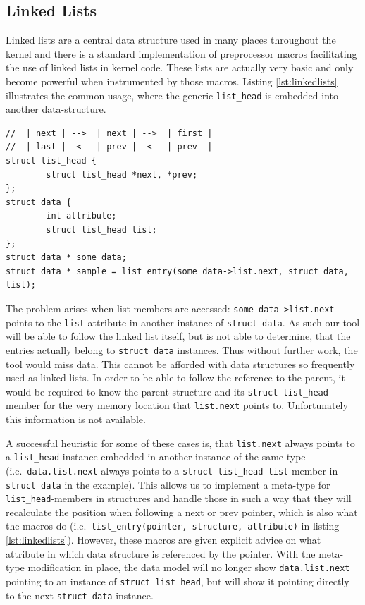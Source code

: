 \subsection{Linked Lists}
\label{sec:linkedlists}
Linked lists are a central data structure used in many places throughout the kernel and there is a standard implementation of preprocessor macros facilitating the use of linked lists in kernel code.
These lists are actually very basic and only become powerful when instrumented by those macros.
Listing \ref{lst:linkedlists} illustrates the common usage, where the generic \texttt{list\_head} is embedded into another data-structure.
\begin{lstlisting}[frame=single,caption=Linked lists as used in the linux kernel,label=lst:linkedlists]
//  | next | -->  | next | -->  | first | 
//  | last |  <-- | prev |  <-- | prev  |
struct list_head {
        struct list_head *next, *prev;
};
struct data {
        int attribute;
        struct list_head list;
};
struct data * some_data;
struct data * sample = list_entry(some_data->list.next, struct data, list);
\end{lstlisting}
The problem arises when list-members are accessed: \texttt{some\_data->list.next} points to the \texttt{list} attribute in another instance of \texttt{struct data}.
As such our tool will be able to follow the linked list itself, but is not able to determine, that the entries actually belong to \texttt{struct data} instances.
Thus without further work, the tool would miss data. This cannot be afforded with data structures so frequently used as linked lists.
In order to be able to follow the reference to the parent, it would be required to know the parent structure and its \texttt{struct list\_head} member for the very memory location that \texttt{list.next} points to.
Unfortunately this information is not available.

A successful heuristic for some of these cases is, that \texttt{list.next} always points to a \texttt{list\_head}-instance embedded in another instance of the same type
(i.e.~\texttt{data.list.next} always points to a \texttt{struct list\_head list} member in \texttt{struct data} in the example).
This allows us to implement a meta-type for \texttt{list\_head}-members in structures and handle those in such a way that they will recalculate the position when following a next or prev pointer,
which is also what the macros do (i.e.~\texttt{list\_entry(pointer, structure, attribute)} in listing \ref{lst:linkedlists}).
However, these macros are given explicit advice on what attribute in which data structure is referenced by the pointer.
With the meta-type modification in place, the data model will no longer show \texttt{data.list.next} pointing to an instance of \texttt{struct list\_head}, but will show it pointing directly to the next \texttt{struct data} instance.

